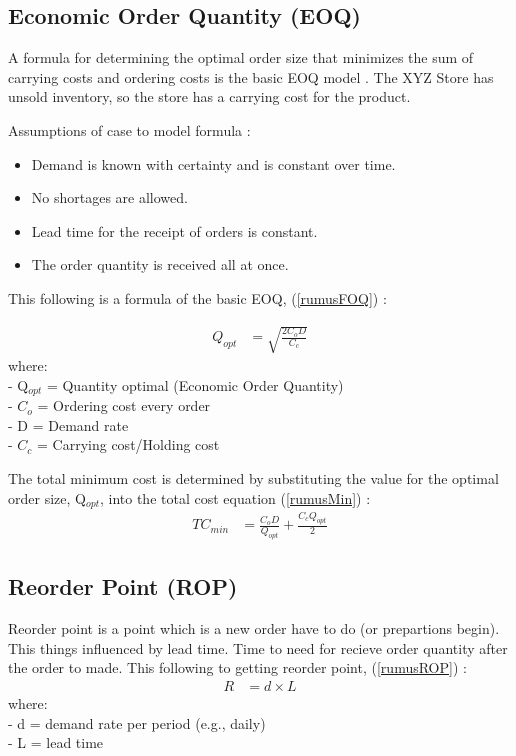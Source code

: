 \documentclass[12pt,a4paper,final]{iopart}
\begin{document}

\subsection{Economic Order Quantity (EOQ)}
A formula for determining the optimal order size that minimizes the sum of carrying costs and ordering costs is the basic EOQ model \cite{Rusell2011}. The XYZ Store has unsold inventory, so the store has a carrying cost for the product.

Assumptions of case to model formula \cite{Rusell2011}: 
\begin{itemize}
	\item Demand is known with certainty and is constant over time.
	\item No shortages are allowed.
	\item Lead time for the receipt of orders is constant.
	\item The order quantity is received all at once.
\end{itemize}
This following is a formula of the basic EOQ, (\ref{rumusFOQ}) :

\begin{eqnarray}
	\label{rumusFOQ}
	Q_{opt} &= \sqrt{\frac{2C_oD}{C_c}}
\end{eqnarray}
where:\\
- Q$_{opt}$ = Quantity optimal (Economic Order Quantity)\\
- $C_o$ = Ordering cost every order\\
- D = Demand rate\\
- $C_c$ = Carrying cost/Holding cost

The total minimum cost is determined by substituting the value for the optimal order size, Q$_{opt}$, into the total cost equation (\ref{rumusMin}) :
\begin{eqnarray}
	\label{rumusMin}
	TC_{min} &= \frac{C_oD}{Q_{opt}} + \frac{C_cQ_{opt}}{2}
\end{eqnarray}

\subsection{Reorder Point (ROP)}
Reorder point is a point which is a new order have to do (or prepartions begin). This things influenced by lead time. Time to need for recieve order quantity after the order to made. This following to getting reorder point, (\ref{rumusROP}) \cite{Rusell2011}:
\begin{eqnarray}
	\label{rumusROP}
	R &= d \times L
\end{eqnarray}
where:\\
- d = demand rate per period (e.g., daily)\\
- L = lead time
\end{document}
